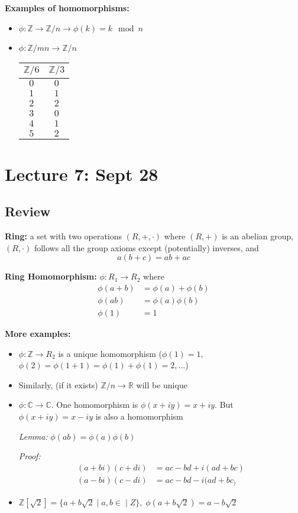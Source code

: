 \documentclass[12pt]{report}
\newcommand{\R}{\mathbb{R}}
\newcommand{\Z}{\mathbb{Z}}
\begin{document}
\textbf{Examples of homomorphisms:}
\begin{itemize}
    \item $\phi: \Z \to \Z/n \longrightarrow \phi(k) = k\mod n$ 
    \item $\phi: \Z/mn \to \Z/n$ 
    \begin{center}
        \begin{tabular*}{0.85in}{|c|c|}
            $\Z/6$ & $\Z/3$\\
            \hline
            $0$ & $0$\\
            $1$ & $1$\\
            $2$ & $2$\\
            $3$ & $0$\\
            $4$ & $1$\\
            $5$ & $2$\\
            \hline
        \end{tabular*}
    \end{center}
\end{itemize}

\section*{Lecture 7: Sept 28}
\subsection*{Review}
\textbf{Ring:} a set with two operations $(R, +, \cdot)$ where $(R, +)$ is an abelian group, $(R, \cdot)$ follows all the group axioms except (potentially) inverses, and 
\[a(b+c) = ab + ac\]

\textbf{Ring Homomorphism:} $\phi: R_1 \to R_2$ where 
\begin{align*}
    \phi(a + b) &= \phi(a) + \phi(b)\\
    \phi(ab) &= \phi(a)\phi(b)\\
    \phi(1) &= 1
\end{align*}

\textbf{More examples:}
\begin{itemize}
    \item $\phi: \Z \to R_2$ is a unique homomorphism ($\phi(1) = 1$, $\phi(2) = \phi(1 + 1) = \phi(1) +\phi(1) = 2, \dots$)
    \item Similarly, (if it exists) $\Z/n \to \R$ will be unique 
    \item $\phi: \mathbb{C} \to \mathbb{C}$. One homomorphism is $\phi(x + iy) = x + iy$. But $\phi(x + iy) = x - iy$ is also a homomorphism
    
    \emph{Lemma:} $\phi(ab) = \phi(a)\phi(b)$

    \emph{Proof:}
    \begin{align*}
        (a+bi)(c+ di) &= ac - bd + i(ad + bc)\\
        (a- bi)(c -di) &= ac - bd - i(ad+bc_)
    \end{align*}

    \item $\Z[\sqrt 2] = \{a + b\sqrt 2 \; | \; a, b\in \; | \;Z\}, \; \phi(a + b\sqrt 2) = a - b\sqrt 2$
\end{itemize}
\end{document}

